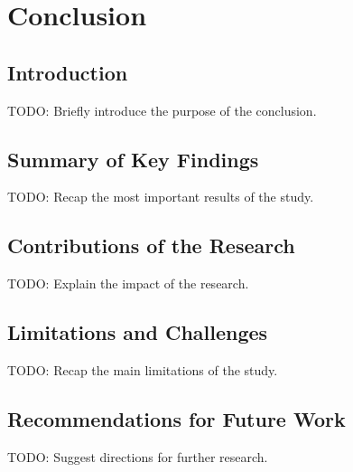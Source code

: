 \chapter{Conclusion}
\label{sec:conclusion}


\section{Introduction}
TODO: Briefly introduce the purpose of the conclusion.

\section{Summary of Key Findings}
TODO: Recap the most important results of the study.

\section{Contributions of the Research}
TODO: Explain the impact of the research.

\section{Limitations and Challenges}
TODO: Recap the main limitations of the study.

\section{Recommendations for Future Work}
TODO: Suggest directions for further research.

